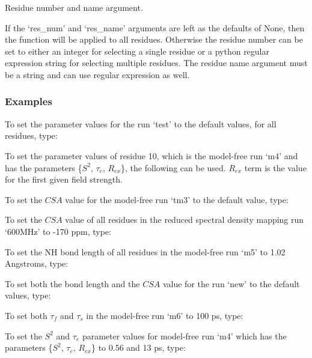Residue number and name argument.

If the `res\_num' and `res\_name' arguments are left as the defaults of None, then the
function will be applied to all residues.  Otherwise the residue number can be set to either
an integer for selecting a single residue or a python regular expression string for
selecting multiple residues.  The residue name argument must be a string and can use regular
expression as well.


\subsubsection{Examples}

To set the parameter values for the run `test' to the default values, for all residues,
type:


To set the parameter values of residue 10, which is the model-free run `m4' and has the
parameters \{$S^2$, $\tau_e$, $R_{ex}$\}, the following can be used.  $R_{ex}$ term is the value for the first
given field strength.



To set the $CSA$ value for the model-free run `tm3' to the default value, type:


To set the $CSA$ value of all residues in the reduced spectral density mapping run `600MHz' to
-170 ppm, type:



To set the NH bond length of all residues in the model-free run `m5' to 1.02 Angstroms,
type:



To set both the bond length and the $CSA$ value for the run `new' to the default values, type:


To set both $\tau_f$ and $\tau_s$ in the model-free run `m6' to 100 ps, type:



To set the $S^2$ and $\tau_e$ parameter values for model-free run `m4' which has the parameters
\{$S^2$, $\tau_e$, $R_{ex}$\} to 0.56 and 13 ps, type:

